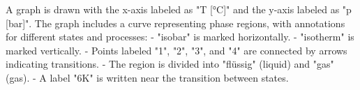 A graph is drawn with the x-axis labeled as "T [°C]" and the y-axis labeled as "p [bar]". The graph includes a curve representing phase regions, with annotations for different states and processes:  
- "isobar" is marked horizontally.  
- "isotherm" is marked vertically.  
- Points labeled "1", "2", "3", and "4" are connected by arrows indicating transitions.  
- The region is divided into "flüssig" (liquid) and "gas" (gas).  
- A label "6K" is written near the transition between states.